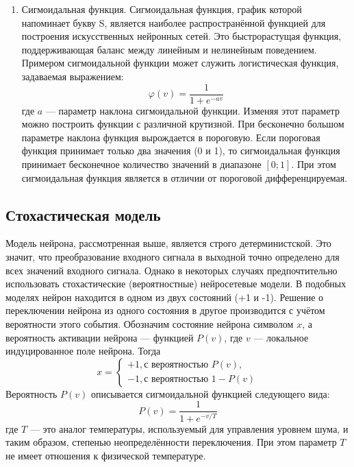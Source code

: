 \begin{enumerate}
\begin{itemize}
\end{itemize}
\item Сигмоидальная функция. 
Сигмоидальная функция, график которой напоминает букву S, является наиболее распространённой функцией для построения искусственных нейронных сетей.
Это быстрорастущая функция, поддерживающая баланс между линейным и нелинейным поведением.
Примером сигмоидальной функции может служить логистическая функция, задаваемая выражением:
\begin{equation}
\varphi(v) = \frac1{1+e^{-av}}
\end{equation}
где $a$ --- параметр наклона сигмоидальной функции.
Изменяя этот параметр можно построить функции с различной крутизной.
При бесконечно большом параметре наклона функция вырождается в пороговую.
Если пороговая функция принимает только два значения (0 и 1), то сигмоидальная функция принимает бесконечное количество значений в диапазоне $[0;1]$.
При этом сигмоидальная функция является в отличии от пороговой дифференцируемая.\cite{NejronnyeSeti}
\end{enumerate}
\subsection{Стохастическая модель}
Модель нейрона, рассмотренная выше, является строго детерминистской.
Это значит, что преобразование входного сигнала в выходной точно определено для всех значений входного сигнала.
Однако в некоторых случаях предпочтительно использовать стохастические (вероятностные) нейросетевые модели.
В подобных моделях нейрон находится в одном из двух состояний (+1 и -1).
Решение о переключении нейрона из одного состояния в другое производится с учётом вероятности этого события.
Обозначим состояние нейрона символом $x$, а вероятность активации нейрона --- функцией $P(v)$, где $v$ --- локальное индуцированное поле нейрона.
Тогда
\begin{equation}
x=
\begin{cases}
+1, \text{с вероятностью } P(v),\\
-1, \text{с вероятностью } 1-P(v)
\end{cases}
\end{equation}
Вероятность $P(v)$ описывается сигмоидальной функцией следующего вида:
\begin{equation}
P(v) = \frac1{1 + e^{- v/T}}
\end{equation}
где $T$ --- это аналог температуры, используемый для управления уровнем шума, и таким образом, степенью неопределённости переключения.
При этом параметр $T$ не имеет отношения к физической температуре. \cite{NejronnyeSeti}
